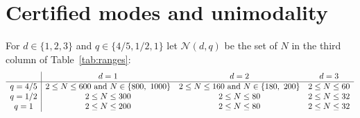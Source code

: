 \documentclass[11pt,a4paper]{article}
\theoremstyle{definition}
\theoremstyle{remark}
\begin{document}
\section{Certified modes and unimodality}\label{sec:modes}

\begin{table}[!htbp]\centering\footnotesize

\caption{Ranges of $N$ covered by the mode certificates, and the parts re-derived by each of the separately written programs (all written within this project and run on the same machine). ``Verified with Python integers'': \texttt{verify\_packed.py} reproduced $t_0$, $t^*$, $T$ and all verdicts, and its enclosures intersect the generator's. ``Exact arithmetic'': \texttt{verify\_packed.py -{}-exact} or \texttt{verify\_exact.py}; no rounding occurs, ties are decided. ``Bit-identical'': \texttt{fpcore.py} reproduced the generator's JSON line including the digest of $(L_T,U_{T+1})$.}\label{tab:ranges}
\end{table}

For $d\in\{1,2,3\}$ and $q\in\{4/5,1/2,1\}$ let $\mathcal N(d,q)$ be the set of $N$ in the third column of Table~\ref{tab:ranges}:
\[
\begin{array}{c|ccc}
 & d=1 & d=2 & d=3\\ \hline
q=4/5 & 2\le N\le600\ \text{and}\ N\in\{800,\ 1000\} & 2\le N\le160\ \text{and}\ N\in\{180,\ 200\} & 2\le N\le60\\
q=1/2 & 2\le N\le300 & 2\le N\le80 & 2\le N\le32\\
q=1 & 2\le N\le200 & 2\le N\le80 & 2\le N\le32
\end{array}
\]
\end{document}
